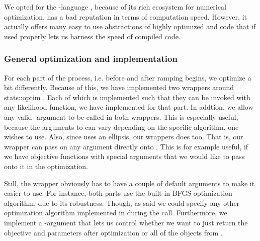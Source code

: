 We opted for the -language \cite{Rlang}, because of its rich ecosystem for numerical optimization.  has a bad reputation in terms of computation speed. However, it actually offers many easy to use abstractions of highly optimized  and  code that if used properly lets us harness the speed of compiled code. 
\subsubsection{General optimization and implementation}
For each part of the process, i.e. before and after ramping begins, we optimize a bit differently. Because of this, we have implemented two wrappers around {stats::optim} \cite{Rlang}. Each of which is implemented such that they can be invoked with any likelihood function, we have implemented for that part. In addtion, we allow any valid -argument to be called in both wrappers. This is especially useful, because the arguments to  can vary depending on the specific algorithm, one wishes to use. Also, since  uses an ellipsis, our wrappers does too. That is, our wrapper can pass on any argument directly onto . This is for example useful, if we have objective functions with special arguments that we would like to pass onto it in the optimization.

Still, the wrapper obviously has to have a couple of default arguments to make it easier to use. For instance, both parts use the built-in BFGS optimization algorithm, due to its robustness. Though, as said we could specify any other optimization algorithm implemented in  during the call. Furthermore, we implement a -argument that lets us control whether we want to just return the objective and parameters after optimization or all of the objects from .

